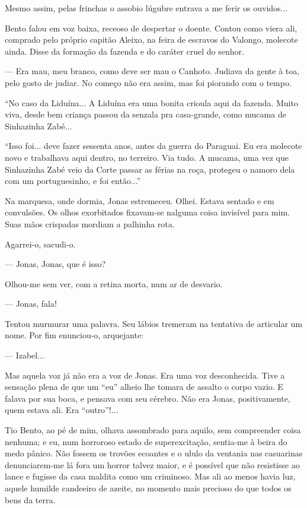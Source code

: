 Mesmo assim, pelas frinchas o assobio lúgubre entrava a me ferir os
ouvidos...

Bento falou em voz baixa, receoso de despertar o doente. Contou como
viera ali, comprado pelo próprio capitão Aleixo, na feira de escravos do
Valongo, molecote ainda. Disse da formação da fazenda e do caráter cruel
do senhor.

--- Era mau, meu branco, como deve ser mau o Canhoto. Judiava da gente à
toa, pelo gosto de judiar. No começo não era assim, mas foi piorando com
o tempo.

``No caso da Liduína... A Liduína era uma bonita crioula aqui da
fazenda. Muito viva, desde bem criança passou da senzala pra
casa-grande, como mucama de Sinhazinha Zabé...

``Isso foi... deve fazer sessenta anos, antes da guerra do Paraguai. Eu
era molecote novo e trabalhava aqui dentro, no terreiro. Via tudo. A
mucama, uma vez que Sinhazinha Zabé veio da Corte passar as férias na
roça, protegeu o namoro dela com um portuguesinho, e foi então...''

Na marquesa, onde dormia, Jonas estremeceu. Olhei. Estava sentado e em
convulsões. Os olhos exorbitados fixavam-se nalguma coisa invisível para
mim. Suas mãos crispadas mordiam a palhinha rota.

Agarrei-o, sacudi-o.

--- Jonas, Jonas, que é isso?

Olhou-me sem ver, com a retina morta, num ar de desvario.

--- Jonas, fala!

Tentou murmurar uma palavra. Seu lábios tremeram na tentativa de
articular um nome. Por fim enunciou-o, arquejante:

--- Izabel...

Mas aquela voz já não era a voz de Jonas. Era uma voz desconhecida. Tive
a sensação plena de que um ``eu'' alheio lhe tomara de assalto o corpo
vazio. E falava por sua boca, e pensava com seu cérebro. Não era Jonas,
positivamente, quem estava ali. Era ``outro''!...

Tio Bento, ao pé de mim, olhava assombrado para aquilo, sem compreender
coisa nenhuma; e eu, num horroroso estado de superexcitação, sentia-me à
beira do medo pânico. Não fossem os trovões ecoantes e o ululo da
ventania nas casuarinas denunciarem-me lá fora um horror talvez maior, e
é possível que não resistisse ao lance e fugisse da casa maldita como um
criminoso. Mas ali ao menos havia luz, aquele humilde candeeiro de
azeite, no momento mais precioso do que todos os bens da terra.

